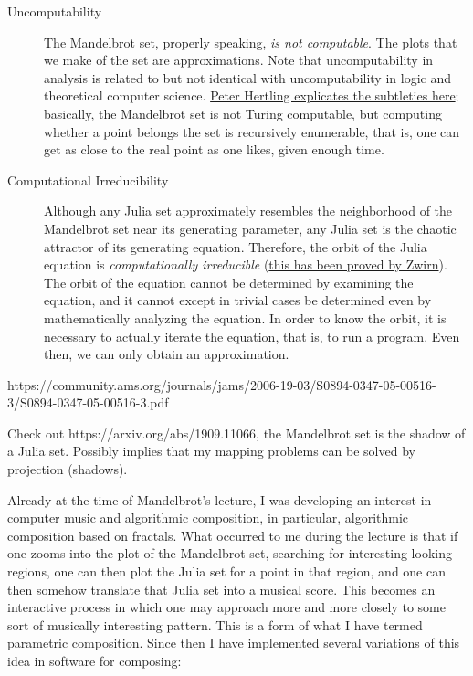 \documentclass[11pt]{amsart}
\begin{document}
\begin{description}
\item[Uncomputability] The Mandelbrot set, properly speaking, \emph{is not computable}. The plots that we make of the set are approximations. Note that uncomputability in analysis is related to but not identical with uncomputability in logic and theoretical computer science. \href{https://citeseerx.ist.psu.edu/document?repid=rep1&type=pdf&doi=7498339680d3e73c206ec75af4c6d0c9b4a10274}{Peter Hertling explicates the subtleties here}; basically, the Mandelbrot set is not Turing computable, but computing whether a point belongs the set is recursively enumerable, that is, one can get as close to the real point as one likes, given enough time.
\item[Computational Irreducibility] Although any Julia set approximately resembles the neighborhood of the Mandelbrot set near its generating parameter, any Julia set is the chaotic attractor of its generating equation. Therefore, the orbit of the Julia equation is \emph{computationally irreducible} (\href{https://arxiv.org/pdf/1304.5247.pdf}{this has been proved by Zwirn}). The orbit of the equation cannot be determined by examining the equation, and it cannot except in trivial cases be determined even by mathematically analyzing the equation. In order to know the orbit, it is necessary to actually iterate the equation, that is, to run a program. Even then, we can only obtain an approximation.
\end{description}

https://community.ams.org/journals/jams/2006-19-03/S0894-0347-05-00516-3/S0894-0347-05-00516-3.pdf

Check out https://arxiv.org/abs/1909.11066, the Mandelbrot set is the shadow of a Julia set. Possibly implies that my mapping problems can be solved by projection (shadows).

Already at the time of Mandelbrot's lecture, I was developing an interest in computer music and algorithmic composition, in particular, algorithmic composition based on fractals. What occurred to me during the lecture is that if one zooms into the plot of the Mandelbrot set, searching for interesting-looking regions, one can then plot the Julia set for a point in that region, and one can then somehow translate that Julia set into a musical score. This becomes an interactive process in which one may approach more and more closely to some sort of musically interesting pattern. This is a form of what I have termed parametric composition. Since then I have implemented several variations of this idea in software for composing:
\end{document}
